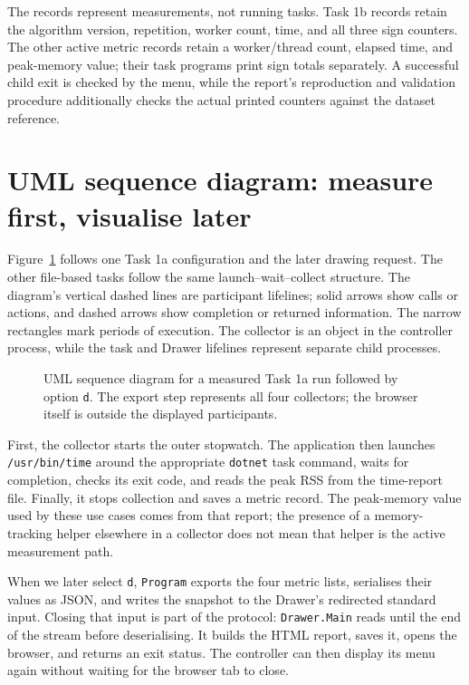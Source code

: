 The records represent measurements, not running tasks. Task 1b records retain the algorithm version, repetition, worker count, time, and all three sign counters. The other active metric records retain a worker/thread count, elapsed time, and peak-memory value; their task programs print sign totals separately. A successful child exit is checked by the menu, while the report's reproduction and validation procedure additionally checks the actual printed counters against the dataset reference.

\section{UML sequence diagram: measure first, visualise later}
Figure~\ref{fig:umlsequence} follows one Task 1a configuration and the later drawing request. The other file-based tasks follow the same launch--wait--collect structure. The diagram's vertical dashed lines are participant lifelines; solid arrows show calls or actions, and dashed arrows show completion or returned information. The narrow rectangles mark periods of execution. The collector is an object in the controller process, while the task and Drawer lifelines represent separate child processes.

\begin{figure}[H]\centering
\begingroup\singlespacing
\resizebox{\textwidth}{!}{}
\endgroup
\caption{UML sequence diagram for a measured Task 1a run followed by option \texttt{d}. The export step represents all four collectors; the browser itself is outside the displayed participants.}\label{fig:umlsequence}
\end{figure}

First, the collector starts the outer stopwatch. The application then launches \texttt{/usr/bin/time} around the appropriate \texttt{dotnet} task command, waits for completion, checks its exit code, and reads the peak RSS from the time-report file. Finally, it stops collection and saves a metric record. The peak-memory value used by these use cases comes from that report; the presence of a memory-tracking helper elsewhere in a collector does not mean that helper is the active measurement path.

When we later select \texttt{d}, \texttt{Program} exports the four metric lists, serialises their values as JSON, and writes the snapshot to the Drawer's redirected standard input. Closing that input is part of the protocol: \texttt{Drawer.Main} reads until the end of the stream before deserialising. It builds the HTML report, saves it, opens the browser, and returns an exit status. The controller can then display its menu again without waiting for the browser tab to close.

